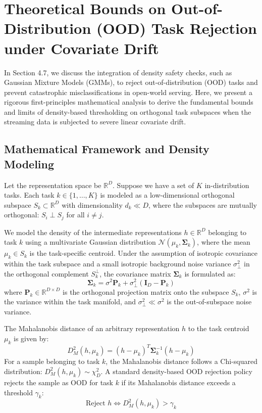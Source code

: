 \documentclass{article}
\theoremstyle{plain}
\theoremstyle{definition}
\theoremstyle{remark}
\begin{document}
\section{Theoretical Bounds on Out-of-Distribution (OOD) Task Rejection under Covariate Drift}
\label{app:ood_rejection_proofs}

In Section 4.7, we discuss the integration of density safety checks, such as Gaussian Mixture Models (GMMs), to reject out-of-distribution (OOD) tasks and prevent catastrophic misclassifications in open-world serving. Here, we present a rigorous first-principles mathematical analysis to derive the fundamental bounds and limits of density-based thresholding on orthogonal task subspaces when the streaming data is subjected to severe linear covariate drift.

\subsection{Mathematical Framework and Density Modeling}
Let the representation space be $\mathbb{R}^D$. Suppose we have a set of $K$ in-distribution tasks. Each task $k \in \{1, \dots, K\}$ is modeled as a low-dimensional orthogonal subspace $S_k \subset \mathbb{R}^D$ with dimensionality $d_k \ll D$, where the subspaces are mutually orthogonal: $S_i \perp S_j$ for all $i \neq j$. 

We model the density of the intermediate representations $h \in \mathbb{R}^D$ belonging to task $k$ using a multivariate Gaussian distribution $\mathcal{N}(\mu_k, \mathbf{\Sigma}_k)$, where the mean $\mu_k \in S_k$ is the task-specific centroid. Under the assumption of isotropic covariance within the task subspace and a small isotropic background noise variance $\sigma_\perp^2$ in the orthogonal complement $S_k^\perp$, the covariance matrix $\mathbf{\Sigma}_k$ is formulated as:
\begin{equation}
\mathbf{\Sigma}_k = \sigma^2 \mathbf{P}_k + \sigma_\perp^2 (\mathbf{I}_D - \mathbf{P}_k)
\end{equation}
where $\mathbf{P}_k \in \mathbb{R}^{D \times D}$ is the orthogonal projection matrix onto the subspace $S_k$, $\sigma^2$ is the variance within the task manifold, and $\sigma_\perp^2 \ll \sigma^2$ is the out-of-subspace noise variance.

The Mahalanobis distance of an arbitrary representation $h$ to the task centroid $\mu_k$ is given by:
\begin{equation}
D_M^2(h, \mu_k) = (h - \mu_k)^T \mathbf{\Sigma}_k^{-1} (h - \mu_k)
\end{equation}
For a sample belonging to task $k$, the Mahalanobis distance follows a Chi-squared distribution: $D_M^2(h, \mu_k) \sim \chi^2_D$. A standard density-based OOD rejection policy rejects the sample as OOD for task $k$ if its Mahalanobis distance exceeds a threshold $\gamma_k$:
\begin{equation}
\text{Reject } h \iff D_M^2(h, \mu_k) > \gamma_k
\end{equation}
\end{document}
